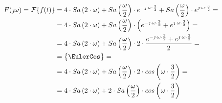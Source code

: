 \begin{task}
\begin{align*}
F(\jmath \omega) = \mathcal F\{f(t)\} &= 4 \cdot Sa\left(2 \cdot \omega\right) + Sa\left(\frac{\omega}{2}\right) \cdot e^{-\jmath \cdot \omega \cdot \frac{3}{2}} + Sa\left(\frac{\omega}{2}\right) \cdot e^{\jmath \cdot \omega \cdot \frac{3}{2}} =\\
&= 4 \cdot Sa\left(2 \cdot \omega\right) + Sa\left(\frac{\omega}{2}\right) \cdot \left( e^{-\jmath \cdot \omega \cdot \frac{3}{2}} + e^{\jmath \cdot \omega \cdot \frac{3}{2}}\right) =\\
&= 4 \cdot Sa\left(2 \cdot \omega\right) + Sa\left(\frac{\omega}{2}\right) \cdot 2 \cdot \frac{ e^{-\jmath \cdot \omega \cdot \frac{3}{2}} + e^{\jmath \cdot \omega \cdot \frac{3}{2}}}{2} =\\
&=\begin{Bmatrix}
\EulerCos
\end{Bmatrix}=\\
&= 4 \cdot Sa\left(2 \cdot \omega\right) + Sa\left(\frac{\omega}{2}\right) \cdot 2 \cdot cos\left(\omega \cdot \frac{3}{2}\right)=\\
&= 4 \cdot Sa\left(2 \cdot \omega\right) + 2 \cdot Sa\left(\frac{\omega}{2}\right) \cdot cos\left(\omega \cdot \frac{3}{2}\right)
\end{align*}


\end{task}

